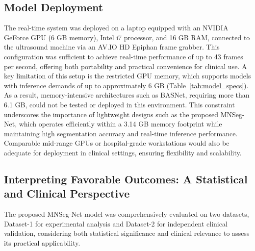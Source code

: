 {\subsection{Model Deployment} }
\noindent
The real-time system was deployed on a laptop equipped with an NVIDIA GeForce GPU (6 GB memory), Intel i7 processor, and 16 GB RAM, connected to the ultrasound machine via an AV.IO HD Epiphan frame grabber. This configuration was sufficient to achieve real-time performance of up to 43 frames per second, offering both portability and practical convenience for clinical use. A key limitation of this setup is the restricted GPU memory, which supports models with inference demands of up to approximately 6 GB (Table~\ref{tab:model_specs}). As a result, memory-intensive architectures such as BASNet, requiring more than 6.1 GB, could not be tested or deployed in this environment. This constraint underscores the importance of lightweight designs such as the proposed MNSeg-Net, which operates efficiently within a 3.14 GB memory footprint while maintaining high segmentation accuracy and real-time inference performance. Comparable mid-range GPUs or hospital-grade workstations would also be adequate for deployment in clinical settings, ensuring flexibility and scalability.



\subsection{Interpreting Favorable Outcomes: A Statistical and Clinical Perspective}\label{sec:statistical_and_clinical_perspective}



The proposed MNSeg-Net model was comprehensively evaluated on two datasets, Dataset-1 for experimental analysis and Dataset-2 for independent clinical validation, considering both statistical significance and clinical relevance to assess its practical applicability.




